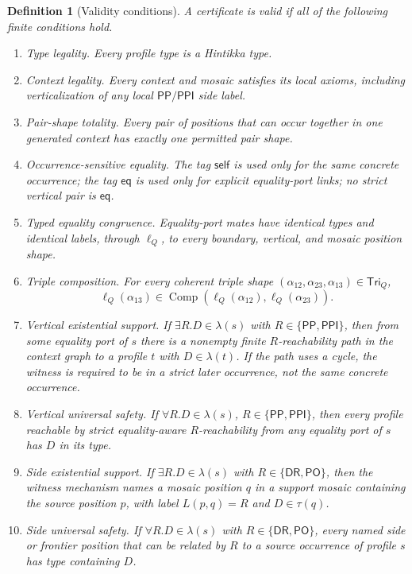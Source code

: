 \documentclass[11pt]{article}
\newtheorem{definition}[theorem]{Definition}
\newcommand{\PP}{\mathsf{PP}}
\newcommand{\PPI}{\mathsf{PPI}}
\newcommand{\PO}{\mathsf{PO}}
\newcommand{\DR}{\mathsf{DR}}
\newcommand{\comp}{\operatorname{Comp}}
\newcommand{\Tri}{\mathsf{Tri}}
\newcommand{\self}{\mathsf{self}}
\newcommand{\eqtag}{\mathsf{eq}}
\begin{document}
\begin{definition}[Validity conditions]
A certificate is valid if all of the following finite conditions hold.
\begin{enumerate}[label=(V\arabic*)]
\item \emph{Type legality.}  Every profile type is a Hintikka type.
\item \emph{Context legality.}  Every context and mosaic satisfies its local axioms, including verticalization of any local \(\PP/\PPI\) side label.
\item \emph{Pair-shape totality.}  Every pair of positions that can occur together in one generated context has exactly one permitted pair shape.
\item \emph{Occurrence-sensitive equality.}  The tag \(\self\) is used only for the same concrete occurrence; the tag \(\eqtag\) is used only for explicit equality-port links; no strict vertical pair is \(\eqtag\).
\item \emph{Typed equality congruence.}  Equality-port mates have identical types and identical labels, through \(\ell_Q\), to every boundary, vertical, and mosaic position shape.
\item \emph{Triple composition.}  For every coherent triple shape \((\alpha_{12},\alpha_{23},\alpha_{13})\in\Tri_Q\),
\[
  \ell_Q(\alpha_{13})\in\comp(\ell_Q(\alpha_{12}),\ell_Q(\alpha_{23})).
\]
\item \emph{Vertical existential support.}  If \(\exists R.D\in\lambda(s)\) with \(R\in\{\PP,\PPI\}\), then from some equality port of \(s\) there is a nonempty finite \(R\)-reachability path in the context graph to a profile \(t\) with \(D\in\lambda(t)\).  If the path uses a cycle, the witness is required to be in a strict later occurrence, not the same concrete occurrence.
\item \emph{Vertical universal safety.}  If \(\forall R.D\in\lambda(s)\), \(R\in\{\PP,\PPI\}\), then every profile reachable by strict equality-aware \(R\)-reachability from any equality port of \(s\) has \(D\) in its type.
\item \emph{Side existential support.}  If \(\exists R.D\in\lambda(s)\) with \(R\in\{\DR,\PO\}\), then the witness mechanism names a mosaic position \(q\) in a support mosaic containing the source position \(p\), with label \(L(p,q)=R\) and \(D\in\tau(q)\).
\item \emph{Side universal safety.}  If \(\forall R.D\in\lambda(s)\) with \(R\in\{\DR,\PO\}\), every named side or frontier position that can be related by \(R\) to a source occurrence of profile \(s\) has type containing \(D\).

\end{enumerate}
\end{definition}
\end{document}
